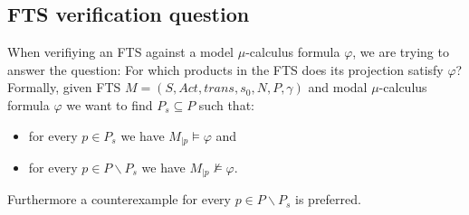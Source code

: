 \subsection{FTS verification question}
When verifiying an FTS against a model $\mu$-calculus formula $\varphi$, we are trying to answer the question: For which products in the FTS does its projection satisfy $\varphi$? Formally, given FTS $M = (S, Act, trans, s_0, N, P, \gamma)$ and modal $\mu$-calculus formula $\varphi$ we want to find $P_s \subseteq P$ such that:
\begin{itemize}
	\item for every $p \in P_s$ we have $M_{|p} \models \varphi$ and
	\item for every $p \in P \backslash P_s$ we have $M_{|p} \not\models \varphi$.
\end{itemize}
Furthermore a counterexample for every $p \in P \backslash P_s$ is preferred.